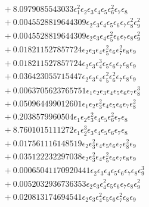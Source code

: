 \documentclass[10pt]{article}
\begin{document}
\begin{align*}
&{}  + 8.0979085543033 \epsilon_{1}^{2} \epsilon_{2} \epsilon_{3} \epsilon_{4} \epsilon_{5} \epsilon_{6}^{2} \epsilon_{7} \epsilon_{8} \\
&{}  + 0.0045528819644309 \epsilon_{2} \epsilon_{3} \epsilon_{4} \epsilon_{5} \epsilon_{6} \epsilon_{7} \epsilon_{8}^{2} \epsilon_{9}^{2} \\
&{}  + 0.0045528819644309 \epsilon_{2} \epsilon_{3} \epsilon_{4} \epsilon_{5}^{2} \epsilon_{6} \epsilon_{7} \epsilon_{8} \epsilon_{9}^{2} \\
&{}  + 0.018211527857724 \epsilon_{2} \epsilon_{3} \epsilon_{4} \epsilon_{5}^{2} \epsilon_{6} \epsilon_{7}^{2} \epsilon_{8} \epsilon_{9} \\
&{}  + 0.018211527857724 \epsilon_{2} \epsilon_{3} \epsilon_{4}^{3} \epsilon_{5} \epsilon_{6} \epsilon_{7} \epsilon_{8} \epsilon_{9} \\
&{}  + 0.036423055715447 \epsilon_{2} \epsilon_{3} \epsilon_{4} \epsilon_{5}^{2} \epsilon_{6}^{2} \epsilon_{7} \epsilon_{8} \epsilon_{9} \\
&{}  + 0.0063705623765751 \epsilon_{1} \epsilon_{2} \epsilon_{3} \epsilon_{4} \epsilon_{5} \epsilon_{6} \epsilon_{7} \epsilon_{8}^{3} \\
&{}  + 0.050964499012601 \epsilon_{1} \epsilon_{2} \epsilon_{3}^{2} \epsilon_{4} \epsilon_{5} \epsilon_{6} \epsilon_{7} \epsilon_{8}^{2} \\
&{}  + 0.2038579960504 \epsilon_{1} \epsilon_{2} \epsilon_{3}^{2} \epsilon_{4} \epsilon_{5} \epsilon_{6}^{2} \epsilon_{7} \epsilon_{8} \\
&{}  + 8.7601015111272 \epsilon_{1} \epsilon_{2}^{3} \epsilon_{3} \epsilon_{4} \epsilon_{5} \epsilon_{6} \epsilon_{7} \epsilon_{8} \\
&{}  + 0.017561116148519 \epsilon_{2} \epsilon_{3}^{2} \epsilon_{4} \epsilon_{5} \epsilon_{6} \epsilon_{7} \epsilon_{8}^{2} \epsilon_{9} \\
&{}  + 0.035122232297038 \epsilon_{2} \epsilon_{3}^{2} \epsilon_{4} \epsilon_{5}^{2} \epsilon_{6} \epsilon_{7} \epsilon_{8} \epsilon_{9} \\
&{}  + 0.00065041170920441 \epsilon_{2} \epsilon_{3} \epsilon_{4} \epsilon_{5} \epsilon_{6} \epsilon_{7} \epsilon_{8} \epsilon_{9}^{3} \\
&{}  + 0.0052032936736353 \epsilon_{2} \epsilon_{3} \epsilon_{4}^{2} \epsilon_{5} \epsilon_{6} \epsilon_{7} \epsilon_{8} \epsilon_{9}^{2} \\
&{}  + 0.020813174694541 \epsilon_{2} \epsilon_{3} \epsilon_{4}^{2} \epsilon_{5} \epsilon_{6} \epsilon_{7}^{2} \epsilon_{8} \epsilon_{9} \\

\end{align*}
\end{document}
